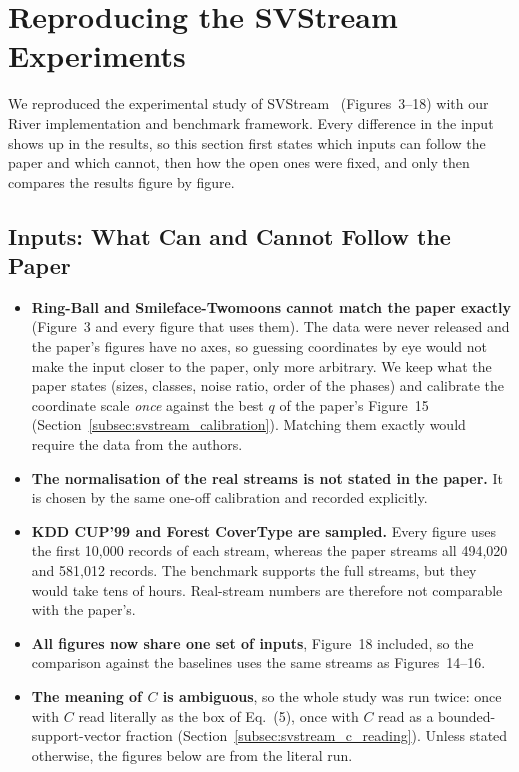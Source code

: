 \section{Reproducing the SVStream Experiments}
\label{sec:svstream_reproduction}

We reproduced the experimental study of SVStream~\cite{wang2013svstream} (Figures~3--18) with our River implementation and benchmark framework. Every difference in the input shows up in the results, so this section first states which inputs can follow the paper and which cannot, then how the open ones were fixed, and only then compares the results figure by figure.

\subsection{Inputs: What Can and Cannot Follow the Paper}
\label{subsec:svstream_inputs}

\begin{itemize}[leftmargin=1.4em,itemsep=2pt]
  \item \textbf{Ring-Ball and Smileface-Twomoons cannot match the paper exactly} (Figure~3 and every figure that uses them). The data were never released and the paper's figures have no axes, so guessing coordinates by eye would not make the input closer to the paper, only more arbitrary. We keep what the paper states (sizes, classes, noise ratio, order of the phases) and calibrate the coordinate scale \emph{once} against the best $q$ of the paper's Figure~15 (Section~\ref{subsec:svstream_calibration}). Matching them exactly would require the data from the authors.
  \item \textbf{The normalisation of the real streams is not stated in the paper.} It is chosen by the same one-off calibration and recorded explicitly.
  \item \textbf{KDD CUP'99 and Forest CoverType are sampled.} Every figure uses the first 10,000 records of each stream, whereas the paper streams all 494,020 and 581,012 records. The benchmark supports the full streams, but they would take tens of hours. Real-stream numbers are therefore not comparable with the paper's.
  \item \textbf{All figures now share one set of inputs}, Figure~18 included, so the comparison against the baselines uses the same streams as Figures~14--16.
  \item \textbf{The meaning of $C$ is ambiguous}, so the whole study was run twice: once with $C$ read literally as the box of Eq.~(5), once with $C$ read as a bounded-support-vector fraction (Section~\ref{subsec:svstream_c_reading}). Unless stated otherwise, the figures below are from the literal run.
\end{itemize}

